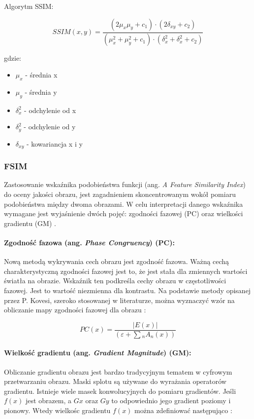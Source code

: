 \documentclass{article}
\begin{document}
Algorytm SSIM:

\begin{equation}
SSIM(x, y) = \frac{(2\mu_{x}\mu_{y} + c_{1}) \cdot (2\delta_{xy} + c_2)}{(\mu_{x}^2 + \mu_{y}^2 + c_{1}) \cdot (\delta_{x}^2 + \delta_{x}^2 + c_2)}
\end{equation}

gdzie:
\begin{itemize}[label=]
    \item $\mu_{x}$ - średnia x
    \item $\mu_{y}$ - średnia y
    \item $\delta_{x}^2$ - odchylenie od x
    \item $\delta_{y}^2$ - odchylenie od y
    \item $\delta_{xy}$ - kowariancja x i y
\end{itemize}

\subsubsection{FSIM}

Zastosowanie wskaźnika podobieństwa funkcji (ang. \emph{A Feature Similarity Index}) do oceny jakości obrazu, 
jest zagadnieniem skoncentrowanym wokół pomiaru podobieństwa między dwoma obrazami.
W celu interpretacji danego wskaźnika wymagane jest wyjaśnienie dwóch pojęć: zgodności fazowej (PC) oraz wielkości gradientu (GM) \cite{fsim_theory}.

\paragraph{Zgodność fazowa (ang. \emph{Phase Congruency}) (PC):}
Nową metodą wykrywania cech obrazu jest zgodność fazowa. Ważną cechą charakterystyczną zgodności fazowej jest to,
że jest stała dla zmiennych wartości światła na obrazie. Wskaźnik ten podkreśla cechy obrazu w częstotliwości fazowej. 
Jest to wartość niezmienna dla kontrastu. Na podstawie metody opisanej przez P. Kovesi, szeroko stosowanej w literaturze, 
można wyznaczyć wzór na obliczanie mapy zgodności fazowej dla obrazu \cite{pc}:

\begin{equation}
PC(x) = \frac{|E(x)|}{(\varepsilon + \sum\limits{_{n}} A_n(x))}
\end{equation}

\paragraph{Wielkość gradientu  (ang. \emph{Gradient Magnitude}) (GM):}
Obliczanie gradientu obrazu jest bardzo tradycyjnym tematem w cyfrowym przetwarzaniu obrazu. 
Maski splotu są używane do wyrażania operatorów gradientu. Istnieje wiele masek konwolucyjnych do pomiaru gradientów. 
Jeśli $f(x)$ jest obrazem, a $Gx$ oraz $Gy$ to odpowiednio jego gradient poziomy i pionowy. 
Wtedy wielkośc gradientu $f(x)$ można zdefiniować następująco \cite{gm}:
\end{document}
